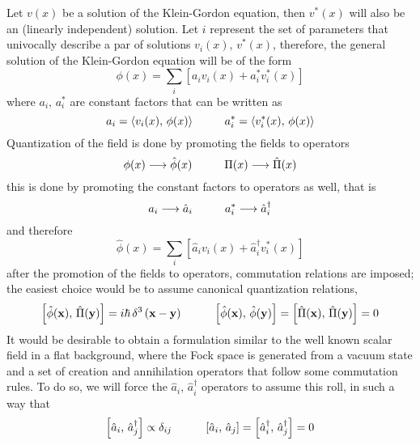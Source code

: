 Let $v(x)$ be a solution of the Klein-Gordon equation, then $v^*(x)$ will also be an (linearly independent) solution. Let $i$ represent the set of parameters that univocally describe a par of solutions $v_i(x),\,v^*(x)$, therefore, the general solution of the Klein-Gordon equation will be of the form
\begin{equation}
	\phi(x)=\sum_ i\left[a_iv_i(x)+a^*_iv^*_i(x)\right]
\end{equation} 
where $a_i,\,a^*_i$ are constant factors that can be written as
\begin{equation}
	a_i = \langle v_i(x),\,\phi(x)\rangle\hspace{1.0cm} a_i^* = \langle v_i^*(x),\,\phi(x)\rangle
\end{equation}
Quantization of the field is done by promoting the fields to operators
\begin{equation}
	\phi(x)\longrightarrow\hat{\phi}(x)\hspace{1.0cm}\Pi(x)\longrightarrow\hat{\Pi}(x)
\end{equation}
this is done by promoting the constant factors to operators as well, that is
\begin{equation}
	a_i\longrightarrow\hat{a}_i\hspace{1.0cm}a_i^*\longrightarrow\hat{a}_i^\dagger
\end{equation}
and therefore
\begin{equation}
	\hat{\phi}(x)=\sum_i\left[\hat{a}_iv_i(x)+\hat{a}_i^\dagger v^*_i(x)\right]
\end{equation}
after the promotion of the fields to operators, commutation relations are imposed; the easiest choice would be to assume canonical quantization relations,
\begin{equation}
	\left[\hat{\phi}(\mathbf{x}),\,\hat{\Pi}(\mathbf{y})\right]=i\hbar \,\delta^3\left(\mathbf{x}-\mathbf{y}\right)\hspace{1.0cm}\left[\hat{\phi}(\mathbf{x}),\,\hat{\phi}(\mathbf{y})\right]=\left[\hat{\Pi}(\mathbf{x}),\,\hat{\Pi}(\mathbf{y})\right]=0
\end{equation}
It would be desirable to obtain a formulation similar to the well known scalar field in a flat background, where the Fock space is generated from a vacuum state and a set of creation and annihilation operators that follow some commutation rules. To do so, we will force the $\hat{a}_i,\,\hat{a}^\dagger_i$ operators to assume this roll, in such a way that
\begin{equation}
	\left[\hat{a}_i,\,\hat{a}_j^\dagger\right]\propto \delta_{ij}\hspace{1.0cm}\left[\hat{a}_i,\,\hat{a}_j\right]=\left[\hat{a}_i^\dagger,\,\hat{a}_j^\dagger\right]=0
\end{equation}
